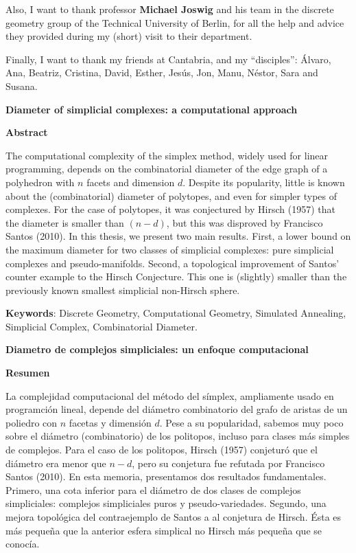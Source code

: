 \documentclass[12pt,a4paper]{article}
\theoremstyle{plain}
\theoremstyle{definition}
\begin{document}
Also, I want to thank professor \textbf{Michael Joswig} and his team in the discrete geometry group of the Technical University of Berlin, for all the help and advice they provided during my (short) visit to their department.

Finally, I want to thank my friends at Cantabria, and my ``disciples'': Álvaro, Ana, Beatriz, Cristina, David, Esther, Jesús, Jon, Manu, Néstor, Sara and Susana.

\newpage

\begin{center}
    \textbf{Diameter of simplicial complexes: a computational approach}
   
    \vspace{0.5cm}
    \textbf{Abstract}
\end{center}
The computational complexity of the simplex method, widely used for linear programming, depends on the combinatorial diameter of the edge graph of a polyhedron with $n$ facets and dimension $d$. Despite its popularity, little is known about the (combinatorial) diameter of polytopes, and even for simpler types of complexes. For the case of polytopes, it was conjectured by Hirsch (1957) that the diameter is smaller than $(n-d)$, but this was disproved by Francisco Santos (2010). In this thesis, we present two main results. First, a lower bound on the maximum diameter for two classes of simplicial complexes: pure simplicial complexes and pseudo-manifolds. Second, a topological improvement of Santos' counter example to the Hirsch Conjecture. This one is (slightly) smaller than the previously known smallest simplicial non-Hirsch sphere.
\vspace{1cm}

\textbf{Keywords}: Discrete Geometry, Computational Geometry, Simulated Annealing, Simplicial Complex, Combinatorial Diameter.

\vspace{2cm}

\begin{center}
    \textbf{Diametro de complejos simpliciales: un enfoque computacional}
   
    \vspace{0.5cm}
    \textbf{Resumen}
\end{center} 
La complejidad computacional del método del símplex, ampliamente usado en programción lineal, depende del diámetro combinatorio del grafo de aristas de un poliedro con $n$ facetas y dimensión $d$. Pese a su popularidad, sabemos muy poco sobre el diámetro (combinatorio) de los politopos, incluso para clases más simples de complejos. Para el caso de los politopos, Hirsch (1957) conjeturó que el diámetro era menor que $n-d$, pero su conjetura fue refutada por Francisco Santos (2010). En esta memoria, presentamos dos resultados fundamentales. Primero, una cota inferior para el diámetro de dos clases de complejos simpliciales: complejos simpliciales puros y pseudo-variedades. Segundo, una mejora topológica del contraejemplo de Santos a al conjetura de Hirsch. Ésta es más pequeña que la anterior esfera simplical no Hirsch más pequeña que se conocía.
\vspace{1cm}
\end{document}
